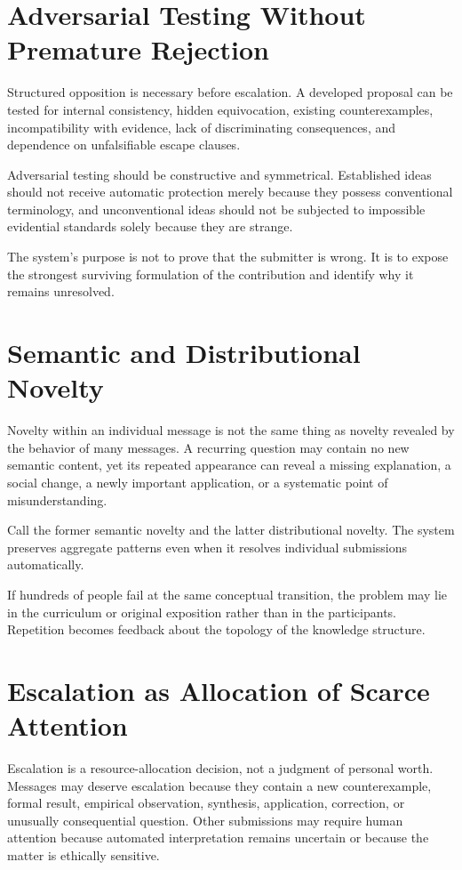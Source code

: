 \documentclass[11pt]{article}
\begin{document}
\section{Adversarial Testing Without Premature Rejection}

Structured opposition is necessary before escalation. A developed proposal can be tested for internal consistency, hidden equivocation, existing counterexamples, incompatibility with evidence, lack of discriminating consequences, and dependence on unfalsifiable escape clauses.

Adversarial testing should be constructive and symmetrical. Established ideas should not receive automatic protection merely because they possess conventional terminology, and unconventional ideas should not be subjected to impossible evidential standards solely because they are strange.

The system's purpose is not to prove that the submitter is wrong. It is to expose the strongest surviving formulation of the contribution and identify why it remains unresolved.

\section{Semantic and Distributional Novelty}

Novelty within an individual message is not the same thing as novelty revealed by the behavior of many messages. A recurring question may contain no new semantic content, yet its repeated appearance can reveal a missing explanation, a social change, a newly important application, or a systematic point of misunderstanding.

Call the former semantic novelty and the latter distributional novelty. The system preserves aggregate patterns even when it resolves individual submissions automatically.

If hundreds of people fail at the same conceptual transition, the problem may lie in the curriculum or original exposition rather than in the participants. Repetition becomes feedback about the topology of the knowledge structure.

\section{Escalation as Allocation of Scarce Attention}

Escalation is a resource-allocation decision, not a judgment of personal worth. Messages may deserve escalation because they contain a new counterexample, formal result, empirical observation, synthesis, application, correction, or unusually consequential question. Other submissions may require human attention because automated interpretation remains uncertain or because the matter is ethically sensitive.
\end{document}
